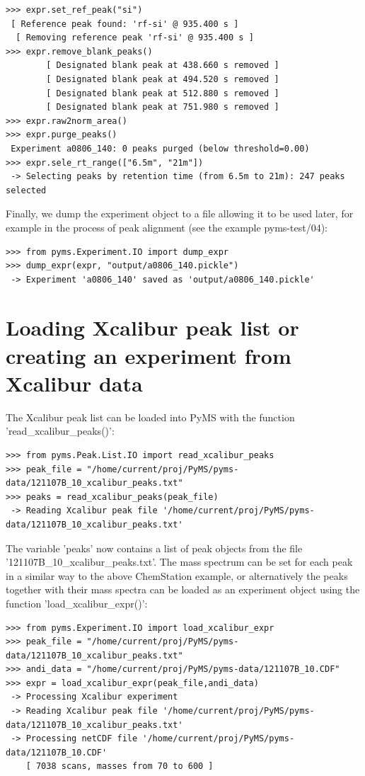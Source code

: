 \begin{verbatim}
>>> expr.set_ref_peak("si")
 [ Reference peak found: 'rf-si' @ 935.400 s ]
  [ Removing reference peak 'rf-si' @ 935.400 s ]
>>> expr.remove_blank_peaks()
        [ Designated blank peak at 438.660 s removed ]
        [ Designated blank peak at 494.520 s removed ]
        [ Designated blank peak at 512.880 s removed ]
        [ Designated blank peak at 751.980 s removed ]
>>> expr.raw2norm_area()
>>> expr.purge_peaks()
 Experiment a0806_140: 0 peaks purged (below threshold=0.00)
>>> expr.sele_rt_range(["6.5m", "21m"])
 -> Selecting peaks by retention time (from 6.5m to 21m): 247 peaks selected
\end{verbatim}

Finally, we dump the experiment object to a file allowing it to be used
later, for example in the process of peak alignment (see the example
pyms-test/04):

\begin{verbatim}
>>> from pyms.Experiment.IO import dump_expr
>>> dump_expr(expr, "output/a0806_140.pickle")
 -> Experiment 'a0806_140' saved as 'output/a0806_140.pickle'
\end{verbatim}

\section{Loading Xcalibur peak list or creating an experiment from Xcalibur data}


The Xcalibur peak list can be loaded into PyMS with the function 'read\_xcalibur\_peaks()':

\begin{verbatim}
>>> from pyms.Peak.List.IO import read_xcalibur_peaks
>>> peak_file = "/home/current/proj/PyMS/pyms-data/121107B_10_xcalibur_peaks.txt"
>>> peaks = read_xcalibur_peaks(peak_file)
 -> Reading Xcalibur peak file '/home/current/proj/PyMS/pyms-data/121107B_10_xcalibur_peaks.txt'
\end{verbatim}

\noindent
The variable 'peaks' now contains a list of peak objects from the file
'121107B\_10\_xcalibur\_peaks.txt'. The mass spectrum can be set for each peak in a 
similar way to the above ChemStation example, or alternatively the peaks together
with their mass spectra can be loaded as an experiment object using the function 
'load\_xcalibur\_expr()':

\begin{verbatim}
>>> from pyms.Experiment.IO import load_xcalibur_expr
>>> peak_file = "/home/current/proj/PyMS/pyms-data/121107B_10_xcalibur_peaks.txt"
>>> andi_data = "/home/current/proj/PyMS/pyms-data/121107B_10.CDF"
>>> expr = load_xcalibur_expr(peak_file,andi_data)
 -> Processing Xcalibur experiment
 -> Reading Xcalibur peak file '/home/current/proj/PyMS/pyms-data/121107B_10_xcalibur_peaks.txt'
 -> Processing netCDF file '/home/current/proj/PyMS/pyms-data/121107B_10.CDF'
    [ 7038 scans, masses from 70 to 600 ]
\end{verbatim}

